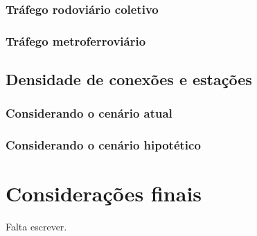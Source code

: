 \documentclass[
article,			%
11pt,				%
oneside,			%
a4paper,			%
english,			%
brazil,				%
sumario=tradicional
]{abntex2}
\begin{document}
	\subsubsection{Tráfego rodoviário coletivo} \label{s3:coletivofuturo}
	
	\subsubsection{Tráfego metroferroviário} \label{s3:metrofuturo}
	
	\subsection{Densidade de conexões e estações} \label{s2:densidadeconexoes}
	
	\subsubsection{Considerando o cenário atual} \label{s3:densidadeatual}
	
	\subsubsection{Considerando o cenário hipotético} \label{s3:densidadefuturo}
	
	
	\section*{Considerações finais}
	
	Falta escrever.
	
	\postextual
	
	
	
	\renewcommand{\glossaryname}{Glossário}
	\renewcommand*{\glsseeformat}[3][\seename]{\textit{#1}
		\glsseelist{#2}}
	
\end{document}
